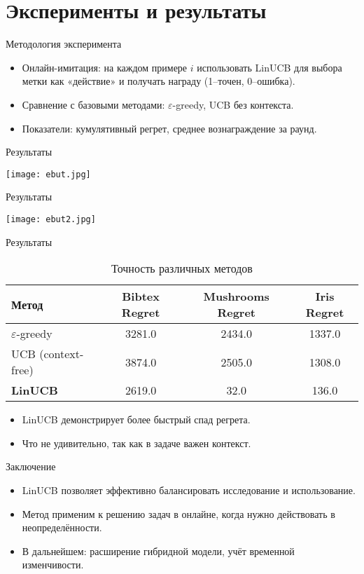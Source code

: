 \documentclass[10pt]{beamer}
\begin{document}
\section{Эксперименты и результаты}
\begin{frame}{Методология эксперимента}
  \begin{itemize}
    \item Онлайн-имитация: на каждом примере $i$ использовать LinUCB для выбора метки как «действие» и получать награду (1–точен, 0–ошибка).
    \item Сравнение с базовыми методами: $\varepsilon$-greedy, UCB без контекста.
    \item Показатели: кумулятивный регрет, среднее вознаграждение за раунд.
  \end{itemize}
\end{frame}
\begin{frame}{Результаты}
  \begin{center}
    \texttt{[image: ebut.jpg]}
  \end{center}
\end{frame}
\begin{frame}{Результаты}
  \begin{center}
    \texttt{[image: ebut2.jpg]}
  \end{center}
\end{frame}
\begin{frame}{Результаты}
  \begin{table}[ht]
    \centering
    \begin{tabular}{lccc}
      \hline
      \textbf{Метод} & \textbf{Bibtex Regret} & \textbf{Mushrooms Regret} & \textbf{Iris Regret} \\
      \hline
      $\varepsilon$-greedy &  3281.0 &  2434.0 & 1337.0 \\
      UCB (context-free) & 3874.0 & 2505.0 & 1308.0 \\
      \textbf{LinUCB } &2619.0& 32.0 & 136.0 \\
      \hline
    \end{tabular}
    \caption{Точность различных методов}
  \end{table}
  \vspace{1em}
  \begin{itemize}
    \item LinUCB демонстрирует более быстрый спад регрета.
    \item Что не удивительно, так как в задаче важен контекст.
  \end{itemize}
\end{frame}

\begin{frame}{Заключение}
  \begin{itemize}
    \item LinUCB позволяет эффективно балансировать исследование и использование.
    \item Метод применим к решению задач в онлайне, когда нужно действовать в неопределённости.
    \item В дальнейшем: расширение гибридной модели, учёт временной изменчивости.
  \end{itemize}
\end{frame}
\end{document}
